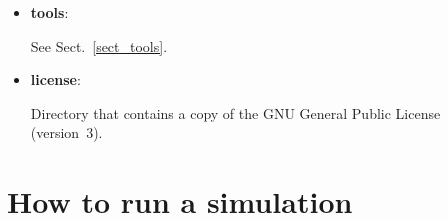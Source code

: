 \documentclass[12pt,a4paper]{article}
\begin{document}
\begin{itemize}
\begin{itemize}

\item
Subdirectory \textbf{quick\_start}:\\
\LaTeX{} source for this manual (PDF must be built with make).

\item
Subdirectory \textbf{doxygen}: documentation to be created by Doxygen\\
(optional, see doxygen-config/README.txt).

\begin{itemize}

\item html/index.html $\longrightarrow$ Source code browser.

\item latex/refman.pdf $\longrightarrow$ Reference manual.

\end{itemize}

\end{itemize}

\item \textbf{tools}:

See Sect.~\ref{sect_tools}.

\item \textbf{license}:

Directory that contains a copy of the GNU General Public License (version~3).

\end{itemize}


\section{How to run a simulation}
\end{document}
